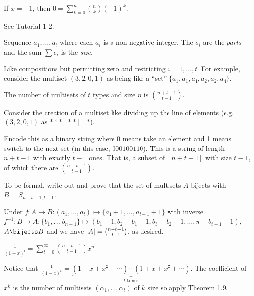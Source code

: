 \documentclass[class=math239,notes]{agony}
\begin{document}
\begin{corollary}
  If $x=-1$, then $0 = \sum_{k=0}^n \binom{n}{k}(-1)^k$.
\end{corollary}
\begin{prf}
  See Tutorial 1-2.
\end{prf}

\begin{defn}
  Sequence $a_1,\dotsc,a_t$ where each $a_i$ is a non-negative integer.
  The $a_i$ are the \emph{parts} and the sum $\sum a_i$ is the \emph{size}.
\end{defn}

Like compositions but permitting zero and restricting $i = 1,\dotsc,t$.
For example, consider the multiset $(3,2,0,1)$ as being like a ``set'' $\{a_1,a_1,a_1,a_2,a_2,a_4\}$.

\begin{theorem}[1.9]
  The number of multisets of $t$ types and size $n$ is $\binom{n+t-1}{t-1}$.
\end{theorem}
\begin{prf}
  Consider the creation of a multiset like dividing up the line of elements
  (e.g. $(3,2,0,1)$ as $***\mid**\mid\;\mid*$).

  Encode this as a binary string where 0 means take an element
  and 1 means switch to the next set (in this case, $000100110$).
  This is a string of length $n+t-1$ with exactly $t-1$ ones.
  That is, a subset of $[n+t-1]$ with size $t-1$, of which there are $\binom{n+t-1}{t-1}$.

  To be formal, write out and prove that the set of multisets $A$ bijects with $B=S_{n+t-1,t-1}$.

  Under $f : A \to B : (a_1,\dotsc,a_t) \mapsto \{a_1+1,\dotsc,a_{t-1}+1\}$
  with inverse $f^{-1} : B \to A : \{b_1,\dotsc,b_{n-1}\} \mapsto (b_1-1,b_2-b_1-1,b_3-b_2-1,\dotsc,n-b_{t-1}-1)$,
  $A \bijects B$ and we have $\abs{A} = \binom{n+t-1}{t-1}$, as desired.
\end{prf}

\begin{theorem}
  $\frac{1}{(1-x)^t} = \sum_{t=0}^\infty \binom{n+t-1}{t-1}x^n$
\end{theorem}
\begin{prf}
  Notice that $\frac{1}{(1-x)^t} = \underbrace{(1+x+x^2+\dotsb)\dotsb(1+x+x^2+\dotsb)}_{t\text{ times}}$.
  The coefficient of $x^k$ is the number of multisets
  $(\alpha_1,\dotsc,\alpha_t)$ of $k$ size so apply Theorem 1.9.
\end{prf}
\end{document}
